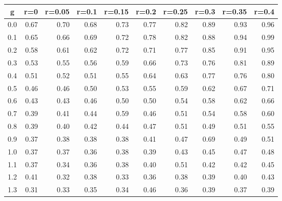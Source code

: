 %
\begin{table}[!tbp]
 \begin{center}
 \begin{tabular}{rrrrrrrrrr}\hline\hline
\multicolumn{1}{c}{g}&\multicolumn{1}{c}{r=0}&\multicolumn{1}{c}{r=0.05}&\multicolumn{1}{c}{r=0.1}&\multicolumn{1}{c}{r=0.15}&\multicolumn{1}{c}{r=0.2}&\multicolumn{1}{c}{r=0.25}&\multicolumn{1}{c}{r=0.3}&\multicolumn{1}{c}{r=0.35}&\multicolumn{1}{c}{r=0.4}\tabularnewline
\hline
0.0&0.67&0.70&0.68&0.73&0.77&0.82&0.89&0.93&0.96\tabularnewline
0.1&0.65&0.66&0.69&0.72&0.78&0.82&0.88&0.94&0.99\tabularnewline
0.2&0.58&0.61&0.62&0.72&0.71&0.77&0.85&0.91&0.95\tabularnewline
0.3&0.53&0.55&0.56&0.59&0.66&0.73&0.76&0.81&0.89\tabularnewline
0.4&0.51&0.52&0.51&0.55&0.64&0.63&0.77&0.76&0.80\tabularnewline
0.5&0.46&0.46&0.50&0.53&0.55&0.59&0.62&0.67&0.71\tabularnewline
0.6&0.43&0.43&0.46&0.50&0.50&0.54&0.58&0.62&0.66\tabularnewline
0.7&0.39&0.41&0.44&0.59&0.46&0.51&0.54&0.58&0.60\tabularnewline
0.8&0.39&0.40&0.42&0.44&0.47&0.51&0.49&0.51&0.55\tabularnewline
0.9&0.37&0.38&0.38&0.38&0.41&0.47&0.69&0.49&0.51\tabularnewline
1.0&0.37&0.37&0.36&0.38&0.39&0.43&0.45&0.47&0.48\tabularnewline
1.1&0.37&0.34&0.36&0.38&0.40&0.51&0.42&0.42&0.45\tabularnewline
1.2&0.41&0.32&0.38&0.33&0.36&0.38&0.39&0.40&0.43\tabularnewline
1.3&0.31&0.33&0.35&0.34&0.46&0.36&0.39&0.37&0.39\tabularnewline
\hline
\end{tabular}

\end{center}

\end{table}

